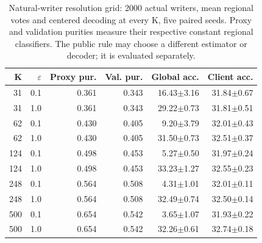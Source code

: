 \begin{table}[t]
\caption{Natural-writer resolution grid: 2000 actual writers, mean regional votes and centered decoding at every K, five paired seeds. Proxy and validation purities measure their respective constant regional classifiers. The public rule may choose a different estimator or decoder; it is evaluated separately.}
\label{tab:femnist-resolution}\small
\centering
\begin{tabular}{@{}rrrrrr@{}}\toprule
K & $\varepsilon$ & Proxy pur. & Val. pur. & Global acc. & Client acc. \\
\midrule
31 & 0.1 & 0.361 & 0.343 & 16.43$\pm$3.16 & 31.84$\pm$0.67 \\
31 & 1.0 & 0.361 & 0.343 & 29.22$\pm$0.73 & 31.81$\pm$0.51 \\
62 & 0.1 & 0.430 & 0.405 & 9.20$\pm$3.79 & 32.01$\pm$0.43 \\
62 & 1.0 & 0.430 & 0.405 & 31.50$\pm$0.73 & 32.51$\pm$0.37 \\
124 & 0.1 & 0.498 & 0.453 & 5.27$\pm$0.50 & 31.97$\pm$0.24 \\
124 & 1.0 & 0.498 & 0.453 & 33.23$\pm$1.27 & 32.55$\pm$0.23 \\
248 & 0.1 & 0.564 & 0.508 & 4.31$\pm$1.01 & 32.01$\pm$0.11 \\
248 & 1.0 & 0.564 & 0.508 & 32.49$\pm$0.74 & 32.50$\pm$0.14 \\
500 & 0.1 & 0.654 & 0.542 & 3.65$\pm$1.07 & 31.93$\pm$0.22 \\
500 & 1.0 & 0.654 & 0.542 & 32.26$\pm$0.61 & 32.74$\pm$0.18 \\
\bottomrule\end{tabular}
\end{table}
